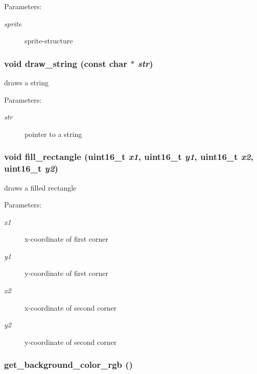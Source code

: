 \begin{Desc}
\item[Parameters:]
\begin{description}
\item[{\em sprite}]sprite-structure \end{description}
\end{Desc}
\hypertarget{group__hgdi__api_gfba093e7eb44678dacadfe498b6c6afa}{
\subsubsection[{draw\_\-string}]{\setlength{\rightskip}{0pt plus 5cm}void draw\_\-string (const char $\ast$ {\em str})}}
\label{group__hgdi__api_gfba093e7eb44678dacadfe498b6c6afa}


draws a string 

\begin{Desc}
\item[Parameters:]
\begin{description}
\item[{\em str}]pointer to a string \end{description}
\end{Desc}
\hypertarget{group__hgdi__api_g7aff5f3016a84ac9cfd360744d653700}{
\subsubsection[{fill\_\-rectangle}]{\setlength{\rightskip}{0pt plus 5cm}void fill\_\-rectangle (uint16\_\-t {\em x1}, \/  uint16\_\-t {\em y1}, \/  uint16\_\-t {\em x2}, \/  uint16\_\-t {\em y2})}}
\label{group__hgdi__api_g7aff5f3016a84ac9cfd360744d653700}


draws a filled rectangle 

\begin{Desc}
\item[Parameters:]
\begin{description}
\item[{\em x1}]x-coordinate of first corner \item[{\em y1}]y-coordinate of first corner \item[{\em x2}]x-coordinate of second corner \item[{\em y2}]y-coordinate of second corner \end{description}
\end{Desc}
\hypertarget{group__hgdi__api_gaff5b39ea1c26814023c4079e9cd91ea}{
\subsubsection[{get\_\-background\_\-color\_\-rgb}]{ get\_\-background\_\-color\_\-rgb ()}}
\label{group__hgdi__api_gaff5b39ea1c26814023c4079e9cd91ea}


